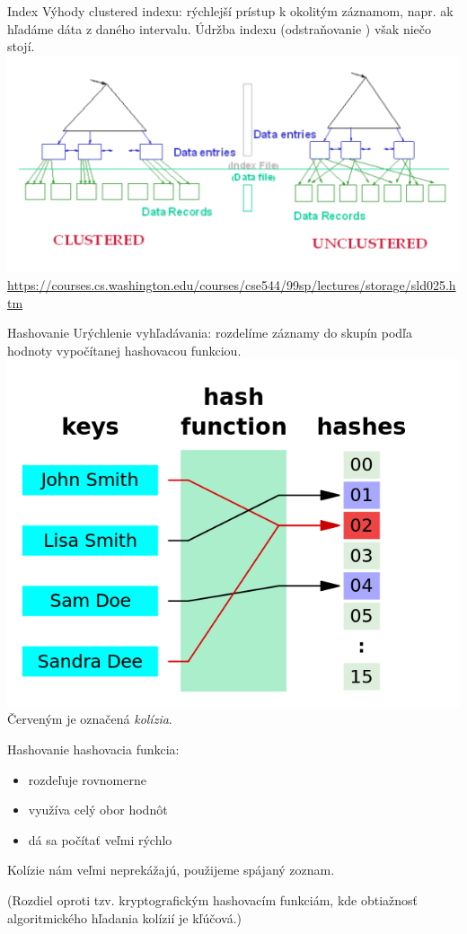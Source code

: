 \documentclass[12pt]{beamer}
\begin{document}
\begin{frame}[fragile]{Index}
Výhody clustered indexu: rýchlejší prístup k okolitým záznamom, napr. ak hľadáme dáta z daného intervalu.
Údržba indexu (odstraňovanie ) však niečo stojí.
\includegraphics[scale=.2]{clustered.png}
{\tiny \url{https://courses.cs.washington.edu/courses/cse544/99sp/lectures/storage/sld025.htm}}
\end{frame}

\begin{frame}[fragile]{Hashovanie}
Urýchlenie vyhľadávania: rozdelíme záznamy do skupín podľa hodnoty vypočítanej hashovacou funkciou.
\includegraphics[scale=.3]{hashing.png}\\
Červeným je označená \emph{kolízia}.
\end{frame}

\begin{frame}[fragile]{Hashovanie}
 hashovacia funkcia:
\begin{itemize}
\item rozdeľuje rovnomerne
\item využíva celý obor hodnôt
\item dá sa počítať veľmi rýchlo
\end{itemize}
Kolízie nám veľmi neprekážajú, použijeme spájaný zoznam.
\bigskip

(Rozdiel oproti tzv. kryptografickým hashovacím funkciám,
kde obtiažnosť algoritmického hľadania kolízií je kľúčová.)
\end{frame}
\end{document}
